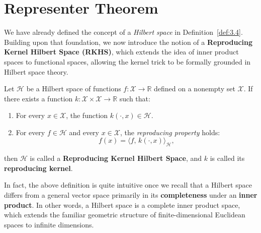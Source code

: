 \documentclass[../main]{subfiles}
\begin{document}
\section{Representer Theorem}
We have already defined the concept of a \emph{Hilbert space} in Definition~\ref{def:3.4}.  
Building upon that foundation, we now introduce the notion of a \textbf{Reproducing Kernel Hilbert Space (RKHS)},  
which extends the idea of inner product spaces to functional spaces, allowing the kernel trick to be formally grounded in Hilbert space theory.
\begin{definition}
    Let $\mathcal{H}$ be a Hilbert space of functions $f:\mathcal{X}\to\mathbb{R}$ defined on a nonempty set $\mathcal{X}$.  
    If there exists a function $k:\mathcal{X}\times\mathcal{X}\to\mathbb{R}$ such that:
    
    \begin{enumerate}
        \item For every $x\in\mathcal{X}$, the function $k(\cdot, x)\in\mathcal{H}$.
        \item For every $f\in\mathcal{H}$ and every $x\in\mathcal{X}$, the \emph{reproducing property} holds:
        \begin{equation}
            f(x) = \langle f,\, k(\cdot, x) \rangle_{\mathcal{H}},
        \end{equation}
    \end{enumerate}
    then $\mathcal{H}$ is called a \textbf{Reproducing Kernel Hilbert Space}, and $k$ is called its \textbf{reproducing kernel}.
    \end{definition}
    \begin{remark}
        In fact, the above definition is quite intuitive once we recall that a Hilbert space differs from a general vector space primarily in its \textbf{completeness} under an \textbf{inner product}. 
        In other words, a Hilbert space is a complete inner product space, which extends the familiar geometric structure of finite-dimensional Euclidean spaces to infinite dimensions.
    \end{remark}
\end{document}
